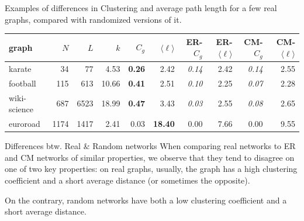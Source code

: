 \documentclass[a4paper,11pt]{book}
\begin{document}
\begin{textbox}

Examples of differences in Clustering and average path length for a few real graphs, compared with randomized versions of it.

\tiny
\tabcolsep=0.05cm

\begin{tabular}{lrrrrrrrrr}
\toprule
        graph &   $N$ &   $L$ &   $k$ &  $C_g$ &  $\langle \ell  \rangle$ &  ER-$C_g$ &  ER-$\langle \ell  \rangle$ &  CM-$C_g$ &  CM-$\langle \ell  \rangle$ \\
\midrule
       karate &    34 &    77 &  4.53 &   \textbf{0.26} &                     2.42 &      \textit{0.14} &                        2.42 &      \textit{0.14} &                        2.55 \\
     football &   115 &   613 & 10.66 &   \textbf{0.41} &                     2.51 &      \textit{0.10} &                        2.25 &      \textit{0.07} &                        2.28 \\
 wiki-science &   687 &  6523 & 18.99 &  \textbf{ 0.47} &                     3.43 &      \textit{0.03} &                        2.55 &      \textit{0.08} &                        2.65 \\
     euroroad &  1174 &  1417 &  2.41 &   0.03 &                    \textbf{18.40} &      0.00 &                        7.66 &      0.00 &                        9.55 \\
\bottomrule
\end{tabular}

\end{textbox}




\begin{textbox}{Differences btw. Real \& Random networks}
When comparing real networks to ER and CM networks of similar properties, we observe that they tend to disagree on one of two key properties: on real graphs, usually, the graph has a high clustering coefficient and a short average distance (or sometimes the opposite). 

On the contrary, random networks have both a low clustering coefficient and a short average distance.  

\end{textbox}
\end{document}
